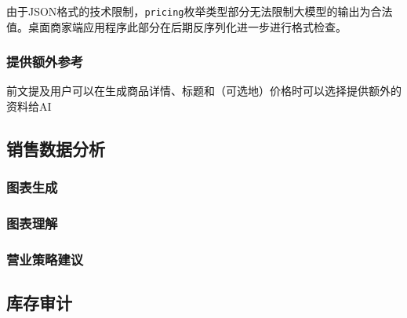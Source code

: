 由于JSON格式的技术限制，\verb|pricing|枚举类型部分无法限制大模型的输出为合法值。桌面商家端应用程序此部分在后期反序列化进一步进行格式检查。

\subsubsection{提供额外参考}
前文提及用户可以在生成商品详情、标题和（可选地）价格时可以选择提供额外的资料给AI

\subsection{销售数据分析}

\subsubsection{图表生成}

\subsubsection{图表理解}

\subsubsection{营业策略建议}

\subsection{库存审计}